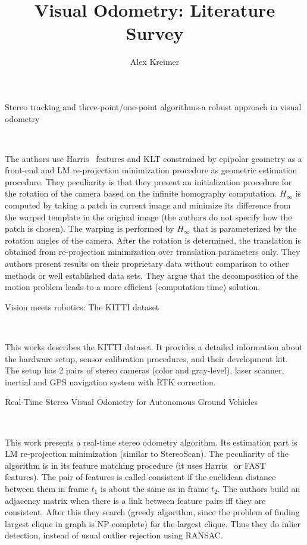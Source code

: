 \documentclass[10pt]{article}         %
\title{Visual Odometry: Literature Survey}
\author{Alex Kreimer}
\begin{document}
\maketitle

\begin{abstract}
\end{abstract}

\begin{enumerate}

  {\Large \item Stereo tracking and three-point/one-point algorithms-a robust approach in visual odometry}~\cite{ni2006stereo}

  The authors use Harris~\cite{harris1988combined} features and KLT
  constrained by epipolar geometry as a front-end and LM re-projection
  minimization procedure as geometric estimation procedure.  They
  peculiarity is that they present an initialization procedure for the
  rotation of the camera based on the infinite homography
  computation. $H_{\infty}$ is computed by taking a patch in current
  image and minimize its difference from the warped template in the
  original image (the authors do not specify how the patch is chosen).
  The warping is performed by $H_{\infty}$ that is parameterized by the
  rotation angles of the camera. After the rotation is determined, the
  translation is obtained from re-projection minimization over
  translation parameters only. They authors present results on their
  proprietary data without comparison to other methods or well
  established data sets.  They argue that the decomposition of the
  motion problem leads to a more efficient (computation time)
  solution.

  {\Large \item Vision meets
    robotics: The KITTI dataset}~\cite{geiger2013vision}

  This works describes the KITTI dataset. It provides a detailed
  information about the hardware setup, sensor calibration procedures,
  and their development kit.  The setup has 2 pairs of stereo cameras
  (color and gray-level), laser scanner, inertial and GPS navigation
  system with RTK correction.

  {\Large \item Real-Time Stereo Visual Odometry for Autonomous Ground
    Vehicles}~\cite{howard2008real}

  This work presents a real-time stereo odometry algorithm.  Its
  estimation part is LM re-projection minimization (similar to
  StereoScan).  The peculiarity of the algorithm is in its feature
  matching procedure (it uses Harris~\cite{harris1988combined} or
  FAST~\cite{rosten2006machine} features).  The pair of features is
  called consistent if the euclidean distance between them in frame
  $t_1$ is about the same as in frame $t_2$.  The authors build an
  adjacency matrix when there is a link between feature pairs iff they
  are consistent.  After this they search (greedy algorithm, since the
  problem of finding largest clique in graph is NP-complete) for the
  largest clique.  Thus they do inlier detection, instead of usual
  outlier rejection using RANSAC.


\end{enumerate}
\end{document}
